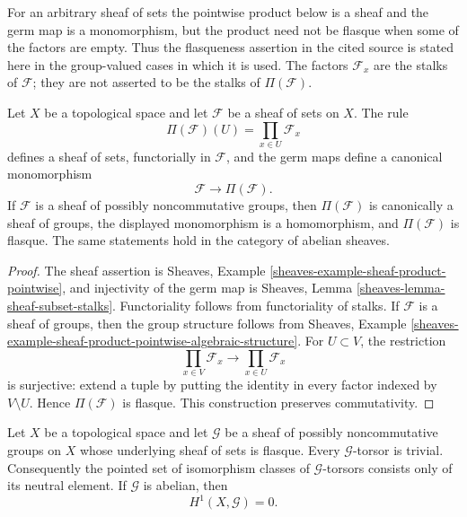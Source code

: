 \begin{lemma}
\label{lemma-pointwise-flasque-envelope-groups}
\begin{reference}
\cite[Chapter III, \S 3.4, proof of Proposition 3.4.2, p. 162]{Tohoku}
\end{reference}
\begin{history}
For an arbitrary sheaf of sets the pointwise product below is a sheaf and
the germ map is a monomorphism, but the product need not be flasque when
some of the factors are empty. Thus the flasqueness assertion in the cited
source is stated here in the group-valued cases in which it is used. The
factors $\mathcal F_x$ are the stalks of $\mathcal F$; they are not asserted
to be the stalks of $\Pi(\mathcal F)$.
\end{history}
Let $X$ be a topological space and let $\mathcal F$ be a sheaf of sets on
$X$. The rule
$$
\Pi(\mathcal F)(U)=\prod_{x\in U}\mathcal F_x
$$
defines a sheaf of sets, functorially in $\mathcal F$, and the germ maps
define a canonical monomorphism
$$
\mathcal F\longrightarrow\Pi(\mathcal F).
$$
If $\mathcal F$ is a sheaf of possibly noncommutative groups, then
$\Pi(\mathcal F)$ is canonically a sheaf of groups, the displayed
monomorphism is a homomorphism, and $\Pi(\mathcal F)$ is flasque. The same
statements hold in the category of abelian sheaves.
\end{lemma}

\begin{proof}
The sheaf assertion is Sheaves, Example
\ref{sheaves-example-sheaf-product-pointwise}, and injectivity of the germ
map is Sheaves, Lemma \ref{sheaves-lemma-sheaf-subset-stalks}.
Functoriality follows from functoriality of stalks. If $\mathcal F$ is a
sheaf of groups, then the group structure follows from Sheaves, Example
\ref{sheaves-example-sheaf-product-pointwise-algebraic-structure}. For
$U\subset V$, the restriction
$$
\prod_{x\in V}\mathcal F_x\longrightarrow
\prod_{x\in U}\mathcal F_x
$$
is surjective: extend a tuple by putting the identity in every factor
indexed by $V\setminus U$. Hence $\Pi(\mathcal F)$ is flasque. This
construction preserves commutativity.
\end{proof}

\begin{lemma}
\label{lemma-flasque-group-torsors-trivial}
\begin{reference}
\cite[Chapter III, \S 3.4, proof of Proposition 3.4.2, p. 162]{Tohoku}
\end{reference}
Let $X$ be a topological space and let $\mathcal G$ be a sheaf of possibly
noncommutative groups on $X$ whose underlying sheaf of sets is flasque.
Every $\mathcal G$-torsor is trivial. Consequently the pointed set of
isomorphism classes of $\mathcal G$-torsors consists only of its neutral
element. If $\mathcal G$ is abelian, then
$$
H^1(X,\mathcal G)=0.
$$
\end{lemma}

